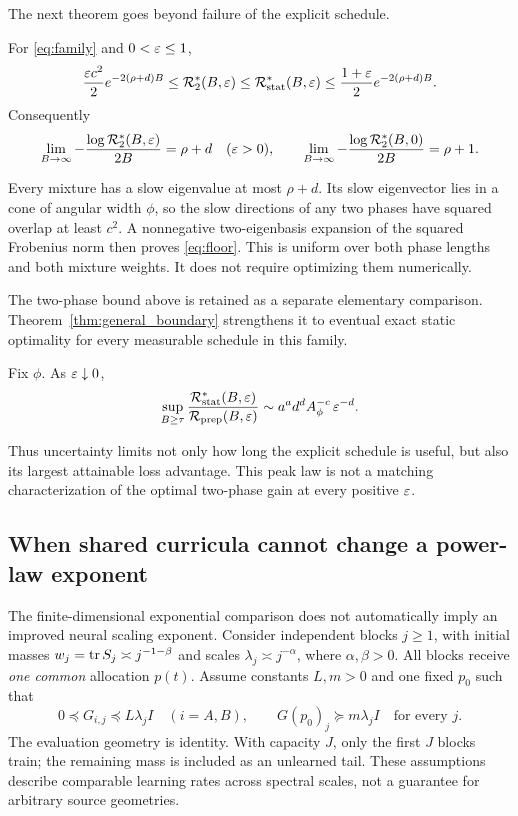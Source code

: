 The next theorem goes beyond failure of the explicit schedule.
\begin{theorem}\label{thm:fullrank}
For \eqref{eq:family} and $0<\varepsilon\le1$,
\begin{equation}
 \frac{\varepsilon c^2}{2}e^{-2(\rho+d)B}
 \le\mathcal R_{2}^*(B,\varepsilon)\le\mathcal R_{\mathrm{stat}}^*(B,\varepsilon)
 \le\frac{1+\varepsilon}{2}e^{-2(\rho+d)B}.\label{eq:floor}
\end{equation}
Consequently
\begin{equation}
 \lim_{B\to\infty}-\frac{\log\mathcal R_{2}^*(B,\varepsilon)}{2B}=\rho+d
 \quad(\varepsilon>0),\qquad
 \lim_{B\to\infty}-\frac{\log\mathcal R_{2}^*(B,0)}{2B}=\rho+1.
\end{equation}
\end{theorem}
Every mixture has a slow eigenvalue at most $\rho+d$. Its slow eigenvector lies in a cone of angular width $\phi$, so the slow directions of any two phases have squared overlap at least $c^2$. A nonnegative two-eigenbasis expansion of the squared Frobenius norm then proves \eqref{eq:floor}. This is uniform over both phase lengths and both mixture weights. It does not require optimizing them numerically.

The two-phase bound above is retained as a separate elementary comparison. Theorem~\ref{thm:general_boundary} strengthens it to eventual exact static optimality for every measurable schedule in this family.

\begin{corollary}\label{cor:peak}
Fix $\phi$. As $\varepsilon\downarrow0$,
\begin{equation}
 \sup_{B\ge\tau}\frac{\mathcal R_{\mathrm{stat}}^*(B,\varepsilon)}{\mathcal R_{\mathrm{prep}}(B,\varepsilon)}
 \sim a^a d^d A_\phi^{-c}\,\varepsilon^{-d}.\label{eq:peak}
\end{equation}
\end{corollary}
Thus uncertainty limits not only how long the explicit schedule is useful, but also its largest attainable loss advantage. This peak law is not a matching characterization of the optimal two-phase gain at every positive $\varepsilon$.

\subsection{When shared curricula cannot change a power-law exponent}\label{sec:spectral}
The finite-dimensional exponential comparison does not automatically imply an improved neural scaling exponent. Consider independent blocks $j\ge1$, with initial masses $w_j=\operatorname{tr} S_j\asymp j^{-1-\beta}$ and scales $\lambda_j\asymp j^{-\alpha}$, where $\alpha,\beta>0$. All blocks receive \emph{one common} allocation $p(t)$. Assume constants $L,m>0$ and one fixed $p_0$ such that
\begin{equation}
 0\preceq G_{i,j}\preceq L\lambda_j I\quad(i=A,B),\qquad
 G(p_0)_j\succeq m\lambda_j I\quad\text{for every }j.\label{eq:envelope}
\end{equation}
The evaluation geometry is identity. With capacity $J$, only the first $J$ blocks train; the remaining mass is included as an unlearned tail. These assumptions describe comparable learning rates across spectral scales, not a guarantee for arbitrary source geometries.

